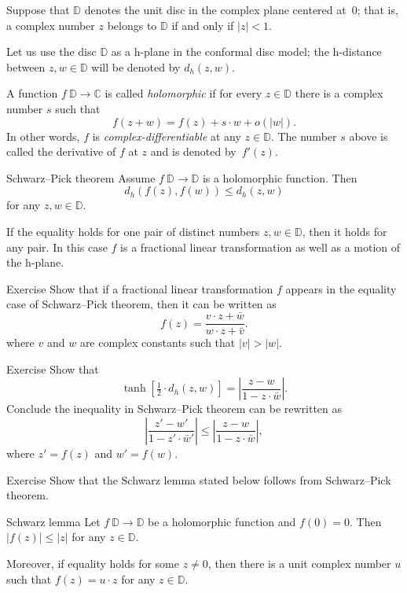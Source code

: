 Suppose that $\mathbb{D}$ denotes the unit disc in the complex plane centered at~$0$;
that is, a complex number $z$
belongs to $\mathbb{D}$ if and only if $|z|<1$.

Let us use the disc $\mathbb{D}$ as a h-plane in the conformal disc model;
the h-distance between $z, w\in\mathbb{D}$ will be denoted by $d_h(z,w)$.

A function $f\:\mathbb{D}\to \mathbb{C}$ is called \emph{holomorphic} if for every $z\in \mathbb{D}$
there is a complex number $s$ such that
\[f(z+w)=f(z)+s\cdot w+o(|w|).\]
In other words, $f$ is {}\emph{complex-differentiable}
at any $z\in\mathbb{D}$.
The number $s$ above is called the derivative of $f$ at $z$ and is denoted by~$f'(z)$.

\begin{thm}{Schwarz--Pick theorem}
Assume $f\: \mathbb{D}\to \mathbb{D}$ is a holomorphic function.
Then 
\[d_h(f(z),f(w))\le d_h(z,w)\]
for any $z,w\in \mathbb{D}$.

If the equality holds for one pair of distinct numbers $z,w\in \mathbb{D}$, then it holds for any pair. 
In this case $f$ is a fractional linear transformation as well as a motion of the h-plane.
\end{thm}

\begin{thm}{Exercise}\label{ex:schwarz-moebius}
Show that if a fractional linear transformation $f$ appears in the equality case of Schwarz--Pick theorem, then it can be written as 
\[f(z)=\frac{v\cdot z+\bar w}{w\cdot z+\bar v}.\]
where $v$ and $w$ are complex constants such that $|v|>|w|$.
\end{thm}


\begin{thm}{Exercise}\label{ex:schwarz-tanh}
Show that 
\[\tanh [\tfrac12\cdot d_h(z,w)]=\left|\frac{z-w}{1-z\cdot\bar w}\right|.\]
Conclude the inequality in Schwarz--Pick theorem can be rewritten as
\[\left|\frac{z'-w'}{1-z'\cdot\bar w'}\right|\le\left|\frac{z-w}{1-z\cdot\bar w}\right|,\]
where
$z'=f(z)$ and $w'=f(w)$.
\end{thm}


\begin{thm}{Exercise}\label{ex:schwarz}
Show that the Schwarz lemma stated below 
follows from Schwarz--Pick theorem.
\end{thm}

\begin{thm}{Schwarz lemma}
Let $f\: \mathbb{D}\to \mathbb{D}$ be a holomorphic function
and $f(0)=0$.
Then 
$|f(z)|\le |z|$
for any $z\in \mathbb{D}$.

Moreover, if equality holds for some $z\ne 0$, then there is a unit complex number $u$ 
such that 
$f(z)=u\cdot z$
for any $z\in\mathbb{D}$.
\end{thm}






